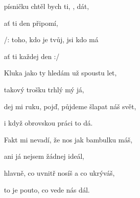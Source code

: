 

\zr
{} písničku chtěl bych ti, , dát,

ať ti  den připomí,

/: toho, {kdo} je tvůj,  jsi  kdo má 

ať ti každej den  :/
\kr

\zs
{Kluka} jako ty hledám už {spoustu} let,

tako{vý} trošku trhlý mý {já},

dej mi {ruku}, pojď, půjdeme {šlapat} náš {svět},

{i} když obrovskou {práci} to {dá}.
\ks

\zr
\kr

\zs
Fakt mi nevadí, že nos jak bambulku máš,

ani já nejsem žádnej ideál,

hlavně, co uvnitř nosíš a co ukrýváš,

to je pouto, co vede nás dál.
\ks

\zr
\kr

\kp


























